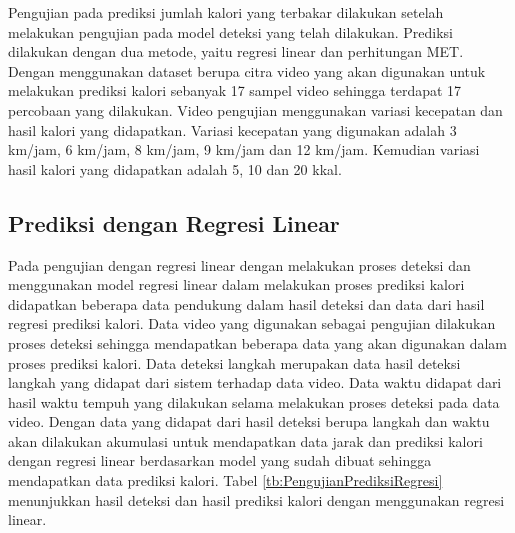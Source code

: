 Pengujian pada prediksi jumlah kalori yang terbakar dilakukan setelah melakukan pengujian pada model deteksi yang telah dilakukan. Prediksi dilakukan dengan dua metode, yaitu regresi linear dan perhitungan MET. Dengan menggunakan dataset berupa citra video yang akan digunakan untuk melakukan prediksi kalori sebanyak 17 sampel video sehingga terdapat 17 percobaan yang dilakukan. Video pengujian menggunakan variasi kecepatan dan hasil kalori yang didapatkan. Variasi kecepatan yang digunakan adalah 3 km/jam, 6 km/jam, 8 km/jam, 9 km/jam dan 12 km/jam. Kemudian variasi hasil kalori yang didapatkan adalah 5, 10 dan 20 kkal. 

\subsection{Prediksi dengan Regresi Linear}
\label{subsec:PengujianPrediksiRegresi}

Pada pengujian dengan regresi linear dengan melakukan proses deteksi dan menggunakan model regresi linear dalam melakukan proses prediksi kalori didapatkan beberapa data pendukung dalam hasil deteksi dan data dari hasil regresi prediksi kalori. Data video yang digunakan sebagai pengujian dilakukan proses deteksi sehingga mendapatkan beberapa data yang akan digunakan dalam proses prediksi kalori. Data deteksi langkah merupakan data hasil deteksi langkah yang didapat dari sistem terhadap data video. Data waktu didapat dari hasil waktu tempuh yang dilakukan selama melakukan proses deteksi pada data video. Dengan data yang didapat dari hasil deteksi berupa langkah dan waktu akan dilakukan akumulasi untuk mendapatkan data jarak dan prediksi kalori dengan regresi linear berdasarkan model yang sudah dibuat sehingga mendapatkan data prediksi kalori. Tabel \ref{tb:PengujianPrediksiRegresi} menunjukkan hasil deteksi dan hasil prediksi kalori dengan menggunakan regresi linear.

